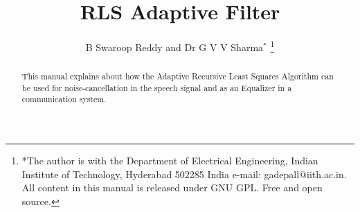 \documentclass[journal,12pt,twocolumn]{IEEEtran}
\begin{document}
\let\StandardTheFigure\thefigure
\renewcommand{\thefigure}{\theproblem}



\makeatletter
{}
\makeatother

\let\StandardTheFigure\thefigure
\let\StandardTheTable\thetable





\def\putbox#1#2#3{\makebox[0in][l]{\makebox[#1][l]{}\raisebox{\baselineskip}[0in][0in]{\raisebox{#2}[0in][0in]{#3}}}}
     \def\rightbox#1{\makebox[0in][r]{#1}}
     \def\centbox#1{\makebox[0in]{#1}}
     \def\topbox#1{\raisebox{-\baselineskip}[0in][0in]{#1}}
     \def\midbox#1{\raisebox{-0.5\baselineskip}[0in][0in]{#1}}

\vspace{3cm}

\title{ 
RLS Adaptive Filter
}

\author{B Swaroop Reddy and Dr G V V Sharma$^{*}$%
	\thanks{*The author is with the Department
		of Electrical Engineering, Indian Institute of Technology, Hyderabad
		502285 India e-mail:  gadepall@iith.ac.in. All content in this manual is released under GNU GPL.  Free and open source.}
	
}	

\maketitle

\tableofcontents
\bigskip

\begin{abstract}
	
	This manual explains about how the Adaptive Recursive Least Squares Algorithm can be used for noise-cancellation in the speech signal and as an Equalizer in a communication system.
	
\end{abstract}
\end{document}
